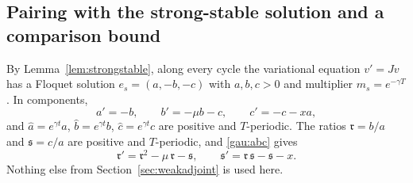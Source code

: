 \subsection{Pairing with the strong-stable solution and a comparison bound}
By Lemma~\ref{lem:strongstable}, along every cycle the variational equation $v'=Jv$ has a Floquet solution $e_s=(a,-b,-c)$ with $a,b,c>0$ and multiplier $m_s=e^{-\gamma T}$. In components,
\begin{equation}\label{gau:abc}
a'=-b,\qquad b'=-\mu b-c,\qquad c'=-c-xa ,
\end{equation}
and $\hat a=e^{\gamma t}a$, $\hat b=e^{\gamma t}b$, $\hat c=e^{\gamma t}c$ are positive and $T$-periodic. The ratios $\mathfrak r=b/a$ and $\mathfrak s=c/a$ are positive and $T$-periodic, and \eqref{gau:abc} gives
\begin{equation}\label{gau:rsriccati}
\mathfrak r'=\mathfrak r^2-\mu\,\mathfrak r-\mathfrak s,\qquad \mathfrak s'=\mathfrak r\,\mathfrak s-\mathfrak s-x .
\end{equation}
Nothing else from Section~\ref{sec:weakadjoint} is used here.

